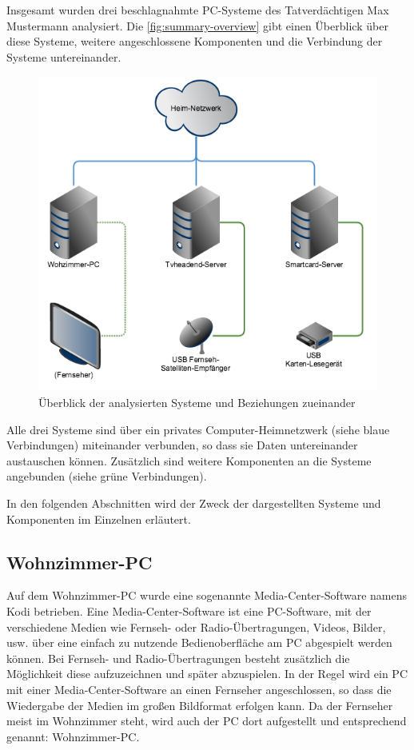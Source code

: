 Insgesamt wurden drei beschlagnahmte PC-Systeme des Tatverdächtigen Max Mustermann analysiert. Die \autoref{fig:summary-overview} gibt einen Überblick über diese Systeme, weitere angeschlossene Komponenten und die Verbindung der Systeme untereinander.

\begin{figure}[H]
\centering
\includegraphics[scale=0.45]{system-overview.png} 
\caption{Überblick der analysierten Systeme und Beziehungen zueinander}
\label{fig:summary-overview}
\end{figure}

Alle drei Systeme sind über ein privates Computer-Heimnetzwerk (siehe blaue Verbindungen) miteinander verbunden, so dass sie Daten untereinander austauschen können. Zusätzlich sind weitere Komponenten an die Systeme angebunden (siehe grüne Verbindungen).

In den folgenden Abschnitten wird der Zweck der dargestellten Systeme und  Komponenten im Einzelnen erläutert.

\subsection{Wohnzimmer-PC}

Auf dem Wohnzimmer-PC wurde eine sogenannte Media-Center-Software namens \mbox{Kodi} betrieben. Eine Media-Center-Software ist eine PC-Software, mit der verschiedene Medien wie Fernseh- oder Radio-Übertragungen, Videos, Bilder, usw. über eine einfach zu nutzende Bedienoberfläche am PC abgespielt werden können. Bei Fernseh- und Radio-Übertragungen besteht zusätzlich die Möglichkeit diese aufzuzeichnen und später abzuspielen. In der Regel wird ein PC mit einer Media-Center-Software an einen Fernseher angeschlossen, so dass die Wiedergabe der Medien im großen Bildformat erfolgen kann. Da der Fernseher meist im Wohnzimmer steht, wird auch der PC dort aufgestellt und entsprechend genannt: Wohnzimmer-PC.

